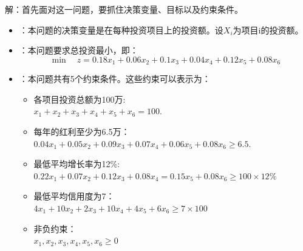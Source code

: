 \begin{frame}{\subsecname}
    解：首先面对这一问题，要抓住决策变量、目标以及约束条件。
    \begin{itemize}
        \item {}：本问题的决策变量是在每种投资项目上的投资额。设$X_i$为项目i的投资额。
        \item {}：本问题要求总投资最小，即：
        $$
        \min \quad z=0.18x_1+0.06x_2+0.1x_3+0.04x_4+0.12x_5+0.08x_6
        $$
        \item {}：本问题共有5个约束条件。这些约束可以表示为：
        \begin{itemize}
            \item 各项目投资总额为100万: \\ $x_1+x_2+x_3+x_4+x_5+x_6=100$.
            \item 每年的红利至少为6.5万：\\
            $0.04x_1+0.05x_2+0.09x_3+0.07x_4+0.06x_5+0.08x_6 \ge 6.5$.
            \item 最低平均增长率为12\%:\\
        $0.22x_1+0.07x_2+0.12x_3+0.08x_4=0.15x_5+0.08x_6 \ge 100\times 12\%$
           \item 最低平均信用度为7： \\
           $4x_1+10x_2+2x_3+10x_4+4x_5+6x_6 \ge 7 \times 100$
           \item 非负约束：\\
           $x_1, x_2,x_3,x_4,x_5,x_6 \ge 0$
        \end{itemize}
    \end{itemize}
\end{frame}

